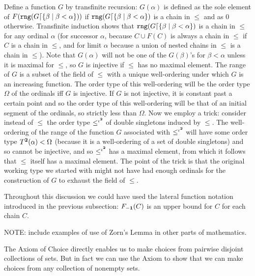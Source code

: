 \documentclass[12pt]{book}
\begin{document}
\begin{description}
  Define a function $G$ by transfinite recursion: $G(\alpha)$ is
defined as the sole element of $F({\tt rng}(G\lceil
\{\beta\mid\beta<\alpha\}))$ if ${\tt rng}(G\lceil
\{\beta\mid\beta<\alpha\})$ is a chain in $\leq$ and as 0 otherwise.
Transfinite induction shows that ${\tt rng}(G\lceil
\{\beta\mid\beta<\alpha\})$ is a chain in $\leq$ for any ordinal
$\alpha$ (for successor $\alpha$, because $C \cup F(C)$ is always a
chain in $\leq$ if $C$ is a chain in $\leq$, and for limit $\alpha$
because a union of nested chains in $\leq$ is a chain in $\leq$).
Note that $G(\alpha)$ will not be one of the $G(\beta)$'s for
$\beta<\alpha$ unless it is maximal for $\leq$, so $G$ is injective if
$\leq$ has no maximal element.  The range of $G$ is a subset of the
field of $\leq$ with a unique well-ordering under which $G$ is an
increasing function.  The order type of this well-ordering will be the
order type $\Omega$ of the ordinals iff $G$ is injective.  If $G$ is
not injective, it is constant past a certain point and so the order
type of this well-ordering will be that of an initial segment of the
ordinals, so strictly less than $\Omega$.  Now we employ a trick:
consider instead of $\leq$ the order type $\leq^{\iota^{\bf 2}}$ of double
singletons induced by $\leq$.  The well-ordering of the range of the
function $G$ associated with $\leq^{\iota^{\bf 2}}$ will have some order
type $T^{\bf 2}(\alpha)<\Omega$ (because it is a well-ordering of a set of
double singletons) and so cannot be injective, and so $\leq^{\iota^{\bf 2}}$
has a maximal element, from which it follows that $\leq$ itself has a
maximal element.  The point of the trick is that the original working
type we started with might not have had enough ordinals for the
construction of $G$ to exhaust the field of $\leq$.

Throughout this discussion we could have used the lateral function
notation introduced in the previous subsection: $F_{\bf -1}(C)$ is an
upper bound for $C$ for each chain $C$.


\end{description}

NOTE: include examples of use of Zorn's Lemma in other parts of
mathematics.

The Axiom of Choice directly enables us to make choices from pairwise
disjoint collections of sets.  But in fact we can use the Axiom to
show that we can make choices from any collection of nonempty sets.
\end{document}

